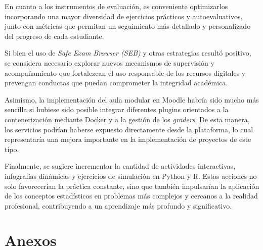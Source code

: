 \documentclass[letter,oneside,12pt,spanish]{report}
\begin{document}
En cuanto a los instrumentos de evaluación, es conveniente optimizarlos incorporando una mayor diversidad de ejercicios prácticos y autoevaluativos, junto con métricas que permitan un seguimiento más detallado y personalizado del progreso de cada estudiante.

Si bien el uso de \textit{Safe Exam Browser (SEB)} y otras estrategias resultó positivo, se considera necesario explorar nuevos mecanismos de supervisión y acompañamiento que fortalezcan el uso responsable de los recursos digitales y prevengan conductas que puedan comprometer la integridad académica.

Asimismo, la implementación del aula modular en Moodle habría sido mucho más sencilla si hubiese sido posible integrar diferentes plugins orientados a la contenerización mediante Docker y a la gestión de los \textit{graders}. De esta manera, los servicios podrían haberse expuesto directamente desde la plataforma, lo cual representaría una mejora importante en la implementación de proyectos de este tipo.

Finalmente, se sugiere incrementar la cantidad de actividades interactivas, infografías dinámicas y ejercicios de simulación en Python y R. Estas acciones no solo favorecerían la práctica constante, sino que también impulsarían la aplicación de los conceptos estadísticos en problemas más complejos y cercanos a la realidad profesional, contribuyendo a un aprendizaje más profundo y significativo.

\newpage

%
%

\printbibliography

\nocite{poniszewska-maranda, burns-kubernetes, torres-bosch-microservicios, armstrong2015,kubevirtio, docker2023, kubelet-doc, namespace-article}
\newpage

\bgroup
\bgroup
\makeatletter
\@openrightfalse
\appendix

\chapter*{Anexos}
\end{document}
